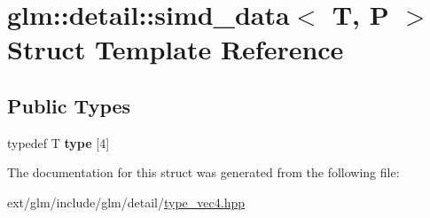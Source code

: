 \hypertarget{structglm_1_1detail_1_1simd__data}{\section{glm\-:\-:detail\-:\-:simd\-\_\-data$<$ T, P $>$ Struct Template Reference}
\label{structglm_1_1detail_1_1simd__data}
}
\subsection*{Public Types}
\begin{DoxyCompactItemize}
\item 
\hypertarget{structglm_1_1detail_1_1simd__data_a2820e1f5f5b8784bfd1083f36b5d9abd}{typedef T {\bfseries type} \mbox{[}4\mbox{]}}\label{structglm_1_1detail_1_1simd__data_a2820e1f5f5b8784bfd1083f36b5d9abd}

\end{DoxyCompactItemize}


The documentation for this struct was generated from the following file\-:\begin{DoxyCompactItemize}
\item 
ext/glm/include/glm/detail/\hyperlink{type__vec4_8hpp}{type\-\_\-vec4.\-hpp}\end{DoxyCompactItemize}
